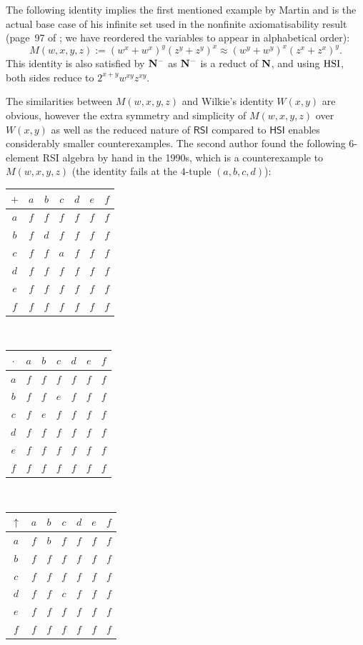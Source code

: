 \documentclass[eqnor,reqno]{amsart}
\theoremstyle{plain}
\theoremstyle{definition}
\newcommand{\HSI}{\textsf{HSI}}
\newcommand{\RSI}{\textsf{RSI}}
\begin{document}
The following identity implies the first mentioned example by Martin and is the actual base case of his infinite set used in the nonfinite axiomatisability result (page~97 of \cite{mar}; we have reordered the variables to appear in alphabetical order): 
\[
M(w,x,y,z):=
(w^x+w^x)^y(z^y+z^y)^x\approx (w^y+w^y)^x(z^x+z^x)^y.
\]  
This
identity is also satisfied by ${\bf N}^{-}$ as ${\bf N}^{-}$ is a reduct of
${\bf N}$, and using ${\rm HSI}$, both sides reduce to
$2^{x+y}w^{xy}z^{xy}$.  

The
similarities between $M(w,x,y,z)$ and Wilkie's identity $W(x,y)$ are
obvious, however the extra symmetry and simplicity of $M(w,x,y,z)$ over
$W(x,y)$ as well as the reduced nature of $\RSI$ compared to $\HSI$ enables considerably smaller counterexamples.  
The second author found the following 6-element RSI algebra by hand in the 1990s, which is a counterexample to $M(w,x,y,z)$ (the
identity fails at the $4$-tuple $(a,b,c,d)$):\\

\noindent \begin{tabular}{c|cccccc}
$+$&$a$&$b$&$c$&$d$&$e$&$f$\\
\hline
$a$&$f$&$f$&$f$&$f$&$f$&$f$\\
$b$&$f$&$d$&$f$&$f$&$f$&$f$\\
$c$&$f$&$f$&$a$&$f$&$f$&$f$\\
$d$&$f$&$f$&$f$&$f$&$f$&$f$\\
$e$&$f$&$f$&$f$&$f$&$f$&$f$\\
$f$&$f$&$f$&$f$&$f$&$f$&$f$\\
\end{tabular}\ \
\begin{tabular}{c|cccccc}
$\cdot$&$a$&$b$&$c$&$d$&$e$&$f$\\
\hline
$a$&$f$&$f$&$f$&$f$&$f$&$f$\\
$b$&$f$&$f$&$e$&$f$&$f$&$f$\\
$c$&$f$&$e$&$f$&$f$&$f$&$f$\\
$d$&$f$&$f$&$f$&$f$&$f$&$f$\\
$e$&$f$&$f$&$f$&$f$&$f$&$f$\\
$f$&$f$&$f$&$f$&$f$&$f$&$f$\\
\end{tabular}\ \
\begin{tabular}{c|cccccc}
$\uparrow$&$a$&$b$&$c$&$d$&$e$&$f$\\
\hline
$a$&$f$&$ b $&$f$&$f$&$f$&$f$\\
$b$&$f$&$f$&$f$&$f$&$f$&$f$\\
$c$&$f$&$f$&$f$&$f$&$f$&$f$\\
$d$&$f$&$f$&$ c $&$f$&$f$&$f$\\
$e$&$f$&$f$&$f$&$f$&$f$&$f$\\
$f$&$f$&$f$&$f$&$f$&$f$&$f$\\
\end{tabular}\\
\end{document}
